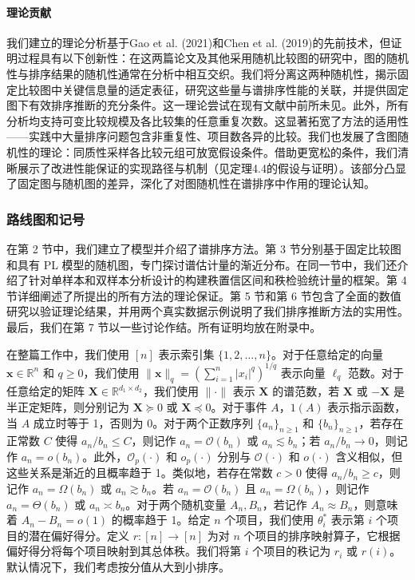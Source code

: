 \paragraph{理论贡献}

我们建立的理论分析基于Gao et al. (2021)和Chen et al. (2019)的先前技术，但证明过程具有以下创新性：在这两篇论文及其他采用随机比较图的研究中，图的随机性与排序结果的随机性通常在分析中相互交织。我们将分离这两种随机性，揭示固定比较图中关键信息量的适定表征，研究这些量与谱排序性能的关联，并提供固定图下有效排序推断的充分条件。这一理论尝试在现有文献中前所未见。此外，所有分析均支持可变比较规模及各比较集的任意重复次数。这显著拓宽了方法的适用性——实践中大量排序问题包含非重复性、项目数各异的比较。我们也发展了含图随机性的理论：同质性采样各比较元组可放宽假设条件。借助更宽松的条件，我们清晰展示了改进性能保证的实现路径与机制（见定理4.4的假设与证明）。该部分凸显了固定图与随机图的差异，深化了对图随机性在谱排序中作用的理论认知。


\subsubsection{路线图和记号}

在第 2 节中，我们建立了模型并介绍了谱排序方法。第 3 节分别基于固定比较图和具有 PL 模型的随机图，专门探讨谱估计量的渐近分布。在同一节中，我们还介绍了针对单样本和双样本分析设计的构建秩置信区间和秩检验统计量的框架。第 4 节详细阐述了所提出的所有方法的理论保证。第 5 节和第 6 节包含了全面的数值研究以验证理论结果，并用两个真实数据示例说明了我们排序推断方法的实用性。最后，我们在第 7 节以一些讨论作结。所有证明均放在附录中。

在整篇工作中，我们使用 $[n]$ 表示索引集 $\{1,2,\dots ,n\}$。对于任意给定的向量 $\mathbf{x} \in \mathbb{R}^n$ 和 $q \geq 0$，我们使用 $\| \mathbf{x}\| _q = (\sum_{i = 1}^{n} |x_i|^q)^{1 / q}$ 表示向量 $\ell_q$ 范数。对于任意给定的矩阵 $\mathbf{X} \in \mathbb{R}^{d_1 \times d_2}$，我们使用 $\| \cdot \|$ 表示 $\mathbf{X}$ 的谱范数，若 $\mathbf{X}$ 或 $- \mathbf{X}$ 是半正定矩阵，则分别记为 $\mathbf{X} \succcurlyeq 0$ 或 $\mathbf{X} \preccurlyeq 0$。对于事件 $A$，$1(A)$ 表示指示函数，当 $A$ 成立时等于 1，否则为 0。对于两个正数序列 $\{a_n\}_{n \geq 1}$ 和 $\{b_n\}_{n \geq 1}$，若存在正常数 $C$ 使得 $a_{n} / b_{n} \leq C$，则记作 $a_n = \mathcal{O}(b_n)$ 或 $a_{n} \lesssim b_{n}$；若 $a_{n} / b_{n} \to 0$，则记作 $a_{n} = o(b_{n})$。此外，$\mathcal{O}_{p}(\cdot)$ 和 $o_{p}(\cdot)$ 分别与 $\mathcal{O}(\cdot)$ 和 $o(\cdot)$ 含义相似，但这些关系是渐近的且概率趋于 1。类似地，若存在常数 $c > 0$ 使得 $a_{n} / b_{n} \geq c$，则记作 $a_{n} = \Omega (b_{n})$ 或 $a_{n} \gtrsim b_{n}$。若 $a_{n} = \mathcal{O}(b_{n})$ 且 $a_{n} = \Omega (b_{n})$，则记作 $a_{n} = \Theta (b_{n})$ 或 $a_{n} \asymp b_{n}$。对于两个随机变量 $A_{n}, B_{n}$，若记作 $A_{n} \approx B_{n}$，则意味着 $A_{n} - B_{n} = o(1)$ 的概率趋于 1。给定 $n$ 个项目，我们使用 $\theta_{i}^{*}$ 表示第 $i$ 个项目的潜在偏好得分。定义 $r: [n] \to [n]$ 为对 $n$ 个项目的排序映射算子，它根据偏好得分将每个项目映射到其总体秩。我们将第 $i$ 个项目的秩记为 $r_{i}$ 或 $r(i)$。默认情况下，我们考虑按分值从大到小排序。


